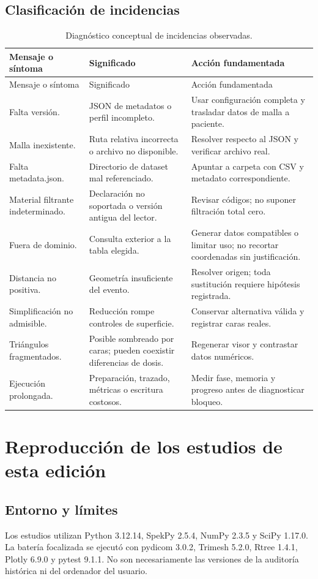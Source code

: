 \section{Clasificación de incidencias}
\begin{longtable}{p{43mm}p{49mm}p{46mm}}
\caption{Diagnóstico conceptual de incidencias observadas.}\\
\toprule Mensaje o síntoma & Significado & Acción fundamentada\\\midrule\endfirsthead
\toprule Mensaje o síntoma & Significado & Acción fundamentada\\\midrule\endhead
\bottomrule\endfoot
Falta versión. & JSON de metadatos o perfil incompleto. & Usar configuración completa y trasladar datos de malla a paciente.\\
Malla inexistente. & Ruta relativa incorrecta o archivo no disponible. & Resolver respecto al JSON y verificar archivo real.\\
Falta metadata.json. & Directorio de dataset mal referenciado. & Apuntar a carpeta con CSV y metadato correspondiente.\\
Material filtrante indeterminado. & Declaración no soportada o versión antigua del lector. & Revisar códigos; no suponer filtración total cero.\\
Fuera de dominio. & Consulta exterior a la tabla elegida. & Generar datos compatibles o limitar uso; no recortar coordenadas sin justificación.\\
Distancia no positiva. & Geometría insuficiente del evento. & Resolver origen; toda sustitución requiere hipótesis registrada.\\
Simplificación no admisible. & Reducción rompe controles de superficie. & Conservar alternativa válida y registrar caras reales.\\
Triángulos fragmentados. & Posible sombreado por caras; pueden coexistir diferencias de dosis. & Regenerar visor y contrastar datos numéricos.\\
Ejecución prolongada. & Preparación, trazado, métricas o escritura costosos. & Medir fase, memoria y progreso antes de diagnosticar bloqueo.\\
\end{longtable}

\chapter{Reproducción de los estudios de esta edición}
\section{Entorno y límites}
Los estudios utilizan Python 3.12.14, SpekPy 2.5.4, NumPy 2.3.5 y SciPy 1.17.0. La batería focalizada se ejecutó con pydicom 3.0.2, Trimesh 5.2.0, Rtree 1.4.1, Plotly 6.9.0 y pytest 9.1.1. No son necesariamente las versiones de la auditoría histórica ni del ordenador del usuario.

